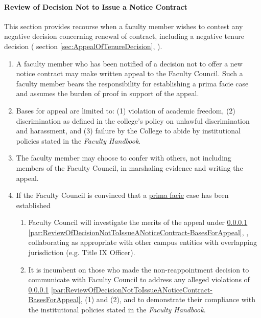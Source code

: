 			\paragraph{Review of Decision Not to Issue a Notice Contract}
				\label{sec:ReviewOfDecisionNotToIssueANoticeContract}
				This section provides recourse when a faculty member wishes to contest any negative decision concerning renewal of contract, including a negative tenure decision (
				section
				\ref{sec:AppealOfTenureDecision},
				).
				\begin{enumerate}[label=\alph*)]
					\item{A faculty member who has been notified of a decision not to offer a new notice contract may make written appeal to the Faculty Council.  Such a faculty member bears the responsibility for establishing a prima facie case and assumes the burden of proof in support of the appeal.}
					\item{
						\label{par:ReviewOfDecisionNotToIssueANoticeContract-BasesForAppeal}
						Bases for appeal are limited to: (1) violation of academic freedom, (2) discrimination as defined in the college's policy on unlawful discrimination and harassment, and (3) failure by the College to abide by institutional policies stated in the \emph{Faculty Handbook}.}
					\item{The faculty member may choose to confer with others, not including members of the Faculty Council, in marshaling evidence and writing the appeal.}
					\item{If the Faculty Council is convinced that a \underline{prima facie} case has been established
						\begin{enumerate}[label=\arabic*)]
							\item{Faculty Council will investigate the merits of the appeal
								under
								\ref{sec:ReviewOfDecisionNotToIssueANoticeContract}
								\ref{par:ReviewOfDecisionNotToIssueANoticeContract-BasesForAppeal},
								, collaborating as appropriate with other campus entities with overlapping jurisdiction (e.g. Title IX Officer).}
							\item{It is incumbent on those who made the non-reappointment decision to communicate with Faculty Council to address any alleged violations of
								\ref{sec:ReviewOfDecisionNotToIssueANoticeContract}
								\ref{par:ReviewOfDecisionNotToIssueANoticeContract-BasesForAppeal},
								(1) and (2), and to demonstrate their compliance with the institutional policies stated in the \emph{Faculty Handbook}.}

\end{enumerate}}
\end{enumerate}
